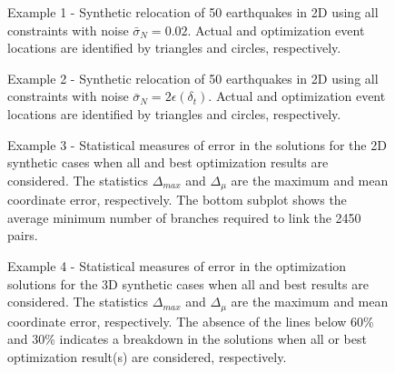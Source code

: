 \documentclass[12pt,double]{article}
\begin{document}
\begin{figure}
\caption{Example 1 - Synthetic relocation of 50 earthquakes in 2D
using all constraints with noise $\bar{\sigma}_N=0.02$. Actual and
optimization event locations are identified by triangles and circles,
respectively.} \label{fig-2D50eq-relocation_eg1}
\end{figure}


\begin{figure}
\caption{Example 2 - Synthetic relocation of 50 earthquakes in 2D
using all constraints with noise $\bar{\sigma}_N= 2
\epsilon(\delta_t)$.
 Actual and optimization event locations
are identified by triangles and circles, respectively.}
\label{fig-2D50eq-relocation_eg3}
\end{figure}


\begin{figure}
\caption{Example 3 - Statistical measures of error in the
 solutions for the 2D synthetic cases when all and best
optimization results are considered. The statistics $\Delta_{max}$
and $\Delta_\mu$  are the maximum and mean coordinate error,
respectively. The bottom subplot shows the average minimum number of
branches required to link the 2450 pairs.}
 \label{fig:optimisationresults-2Dsynth}
\end{figure}


\begin{figure}
\caption{Example 4 - Statistical measures of error in the
optimization solutions for the 3D synthetic cases when all
and best results are considered. The statistics
$\Delta_{max}$ and $\Delta_\mu$ are the maximum and mean coordinate
error, respectively. The absence of the lines below
60\% and 30\% indicates a breakdown in the solutions when all or
best optimization result(s) are considered, respectively.}
\label{fig:optimisationresults-3Dsynth}
\end{figure}
\end{document}
